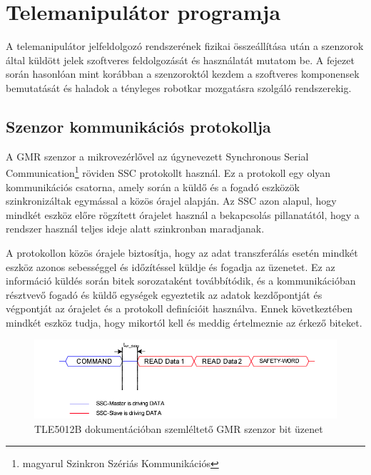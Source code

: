 \chapter{Telemanipulátor programja}
\label{sec:Prog_nagy_fej}

A telemanipulátor jelfeldolgozó rendszerének fizikai összeállítása után a szenzorok által küldött jelek szoftveres feldolgozását és használatát mutatom be. A fejezet során hasonlóan mint korábban a szenzoroktól kezdem a szoftveres komponensek bemutatását és haladok a tényleges robotkar mozgatásra szolgáló rendszerekig.

\section{Szenzor kommunikációs protokollja}
\label{sec:ssc_kom}
A GMR szenzor a mikrovezérlővel az úgynevezett Synchronous Serial Communication\footnote{magyarul Szinkron Szériás Kommunikációs} röviden SSC protokollt használ. Ez a protokoll egy olyan kommunikációs csatorna, amely során a küldő és a fogadó eszközök szinkronizáltak egymással a közös órajel alapján. Az SSC azon alapul, hogy mindkét eszköz előre rögzített órajelet használ a bekapcsolás pillanatától, hogy a rendszer használ teljes ideje alatt szinkronban maradjanak.

A protokollon közös órajele biztosítja, hogy az adat transzferálás esetén mindkét eszköz azonos sebességgel és időzítéssel küldje és fogadja az üzenetet. Ez az információ küldés során bitek sorozataként továbbítódik, és a kommunikációban résztvevő fogadó és küldő egységek egyeztetik az adatok kezdőpontját és végpontját az órajelet és a protokoll definícióit használva. Ennek következtében mindkét eszköz tudja, hogy mikortól kell és meddig értelmeznie az érkező biteket.

\begin{figure}[!ht]
\centering
\includegraphics[width=120mm, keepaspectratio]{figures/Szenzor/tle5012b_bitek}
\caption{TLE5012B dokumentációban szemléltető GMR szenzor bit üzenet}
\label{fig:szenzor_bitek}
\end{figure}

